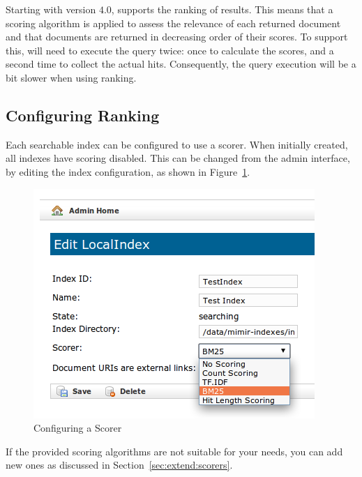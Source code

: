 Starting with version $4.0$, \Mimir{} supports the ranking of results. This
means that a scoring algorithm is applied to assess the relevance of each
returned document and that documents are returned in decreasing order of their
scores. To support this, \Mimir{} will need to execute the query twice: once to
calculate the scores, and a second time to collect the actual hits.
Consequently, the query execution will be a bit slower when using ranking.
 
\subsection{Configuring Ranking}

Each searchable index can be configured to use a scorer. When initially created,
all indexes have scoring disabled. This can be changed from the admin interface,
by editing the index configuration, as shown in Figure~\ref{fig:config-scorer}.

\begin{figure}
\begin{center}
\includegraphics[scale=0.4]{img/index-config-scorer}
\caption{Configuring a Scorer}
\label{fig:config-scorer}
\end{center}
\end{figure}

If the provided scoring algorithms are not suitable for your needs, you can add
new ones as discussed in Section~\ref{sec:extend:scorers}.
